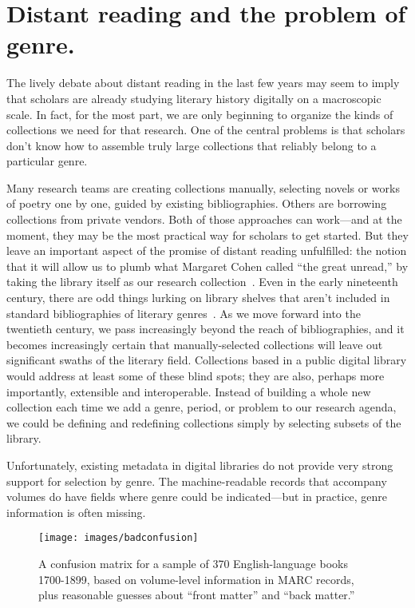 \documentclass[paper=a4, fontsize=12pt]{scrartcl}
\numberwithin{equation}{section}		%
\numberwithin{figure}{section}			%
\numberwithin{table}{section}				%
\begin{document}
\newpage
\section{Distant reading and the problem of genre.}
The lively debate about distant reading in the last few years may seem to imply that scholars are already studying literary history digitally on a macroscopic scale. In fact, for the most part, we are only beginning to organize the kinds of collections we need for that research. One of the central problems is that scholars don't know how to assemble truly large collections that reliably belong to a particular genre.

Many research teams are creating collections manually, selecting novels or works of poetry one by one, guided by existing bibliographies. Others are borrowing collections from private vendors. Both of those approaches can work---and at the moment, they may be the most practical way for scholars to get started. But they leave an important aspect of the promise of distant reading unfulfilled: the notion that it will allow us to plumb what Margaret Cohen called ``the great unread,'' by taking the library itself as our research collection~\cite{cohen:unread, moretti:world}. Even in the early nineteenth century, there are odd things lurking on library shelves that aren't included in standard bibliographies of literary genres~\cite{underwood:blurry}. As we move forward into the twentieth century, we pass increasingly beyond the reach of bibliographies, and it becomes increasingly certain that manually-selected collections will leave out significant swaths of the literary field. Collections based in a public digital library would address at least some of these blind spots; they are also, perhaps more importantly, extensible and interoperable. Instead of building a whole new collection each time we add a genre, period, or problem to our research agenda, we could be defining and redefining collections simply by selecting subsets of the library.

Unfortunately, existing metadata in digital libraries do not provide very strong support for selection by genre. The machine-readable records that accompany volumes do have fields where genre could be indicated---but in practice, genre information is often missing.

\begin{figure}[!h]
\centering
\texttt{[image: images/badconfusion]}
\caption{A confusion matrix for a sample of 370 English-language books 1700-1899, based on volume-level information in MARC records, plus reasonable guesses about ``front matter'' and ``back matter.''}
\label{badconfusion}
\end{figure}
\FloatBarrier
\end{document}
